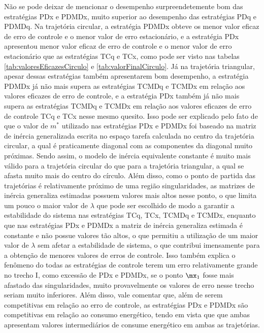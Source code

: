 \documentclass[]{politex}
\begin{document}
Não se pode deixar de mencionar o desempenho surpreendetemente bom das estratégias PDx e PDMDx, muito superior ao desempenho das estratégias PDq e PDMDq. Na trajetória circular, a estratégia PDMDx obteve os menor valor eficaz de erro de controle e o menor valor de erro estacionário, e a estratégia PDx apresentou menor valor eficaz de erro de controle e o menor valor de erro estacionário que as estratégias TCq e TCx, como pode ser visto nas tabelas \ref{tab:valoresEficazesCirculo} e \ref{tab:valorFinalCirculo}. Já na trajetória triangular, apesar dessas estratégias também apresentarem bom desempenho, a estratégia PDMDx já não mais supera as estratégias TCMDq e TCMDx em relação aos valores eficazes de erro de controle, e a estratégia PDx também já não mais supera as estratégias TCMDq e TCMDx em relação aos valores eficazes de erro de controle TCq e TCx nesse mesmo quesito. Isso pode ser explicado pelo fato de que o valor de $m^*$ utilizado nas estratégias PDx e PDMDx foi baseado na matriz de inércia generalizada escrita no espaço tarefa calculada no centro da trajetória circular, a qual é praticamente diagonal com as componentes da diagonal muito próximas. Sendo assim, o modelo de inércia equivalente constante é muito mais válido para a trajetória circular do que para a trajetória triangular, a qual se afasta muito mais do centro do círculo. Além disso, como o ponto de partida das trajetórias é relativamente próximo de uma região singularidades, as matrizes de inércia generaliza estimadas possuem valores mais altos nesse ponto, o que limita um pouco o maior valor de $\lambda$ que pode ser escolhido de modo a garantir a estabilidade do sistema nas estratégias TCq, TCx, TCMDq e TCMDx, enquanto que nas estratégias PDx e PDMDx a matriz de inércia generaliza estimada é constante e não possue valores tão altos, o que permitiu a utilização de um maior valor de $\lambda$ sem afetar a estabilidade de sistema, o que contribui imensamente para a obtenção de menores valores de erros de controle. Isso também explica o fenômeno do todas as estratégias de controle terem um erro relativamente grande no trecho I, como excessão de PDx e PDMDx, se o ponto $\mx_1$ fosse mais afastado das singularidades, muito provavelmente os valores de erro nesse trecho seriam muito inferiores. Além disso, vale comentar que, além de serem competitivas em relação ao erro de controle, as estratégias PDx e PDMDx são competitivas em relação ao consumo energético, tendo em vista que que ambas apresentam valores intermediários de consume energético em ambas as trajetórias.
\end{document}
